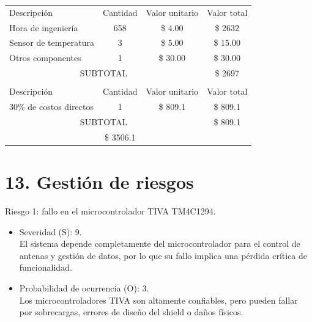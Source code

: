 \documentclass[
11pt, %
]{charter}
\begin{document}
\begin{table}[htpb]
\centering
\begin{tabularx}{\linewidth}{@{}|X|c|r|r|@{}}
\hline
\rowcolor[HTML]{C0C0C0} 
\multicolumn{4}{|c|}{\cellcolor[HTML]{C0C0C0}COSTOS DIRECTOS} \\ \hline
\rowcolor[HTML]{C0C0C0} 
Descripción &
  \multicolumn{1}{c|}{\cellcolor[HTML]{C0C0C0}Cantidad} &
  \multicolumn{1}{c|}{\cellcolor[HTML]{C0C0C0}Valor unitario} &
  \multicolumn{1}{c|}{\cellcolor[HTML]{C0C0C0}Valor total} \\ \hline
Hora de ingeniería  &
  \multicolumn{1}{c|}{658} & 
  \multicolumn{1}{c|}{\$ 4.00} &
  \multicolumn{1}{c|}{\$ 2632} \\ \hline
Sensor de temperatura &
  \multicolumn{1}{c|}{3} &
  \multicolumn{1}{c|}{\$ 5.00} &
  \multicolumn{1}{c|}{\$ 15.00} \\ \hline
Otros componentes &
\multicolumn{1}{c|}{1} &
   \multicolumn{1}{c|}{\$ 30.00} &
   \multicolumn{1}{c|}{\$ 30.00} \\ \hline
\multicolumn{3}{|c|}{SUBTOTAL} &
  \multicolumn{1}{c|}{\$ 2697} \\ \hline
\rowcolor[HTML]{C0C0C0} 
\multicolumn{4}{|c|}{\cellcolor[HTML]{C0C0C0}COSTOS INDIRECTOS} \\ \hline
\rowcolor[HTML]{C0C0C0} 
Descripción &
  \multicolumn{1}{c|}{\cellcolor[HTML]{C0C0C0}Cantidad} &
  \multicolumn{1}{c|}{\cellcolor[HTML]{C0C0C0}Valor unitario} &
  \multicolumn{1}{c|}{\cellcolor[HTML]{C0C0C0}Valor total} \\ \hline
30\% de costos directos  &
\multicolumn{1}{c|}{1} &
\multicolumn{1}{c|}{\$ 809.1} &
\multicolumn{1}{c|}{\$ 809.1} \\ \hline

\multicolumn{3}{|c|}{SUBTOTAL} &
\multicolumn{1}{c|}{\$ 809.1} \\ \hline
\rowcolor[HTML]{C0C0C0}
\multicolumn{3}{|c|}{TOTAL} &
\multicolumn{1}{c|}{\$ 3506.1} \\ \hline
\end{tabularx}%
\end{table}



\section{13. Gestión de riesgos}
\label{sec:riesgos}

 
Riesgo 1: fallo en el microcontrolador TIVA TM4C1294.
\begin{itemize}
	\item Severidad (S): 9. \\ 
	El sistema depende completamente del microcontrolador para el control de antenas y gestión de datos, por lo que su fallo implica una pérdida crítica de funcionalidad.
	\item Probabilidad de ocurrencia (O): 3. \\
	Los microcontroladores TIVA son altamente confiables, pero pueden fallar por sobrecargas, errores de diseño del shield o daños físicos.
\end{itemize}   
\end{document}
